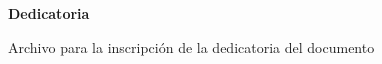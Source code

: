 \begin{center}
    \textbf{Dedicatoria}\par
\end{center}

Archivo para la inscripción de la dedicatoria del documento